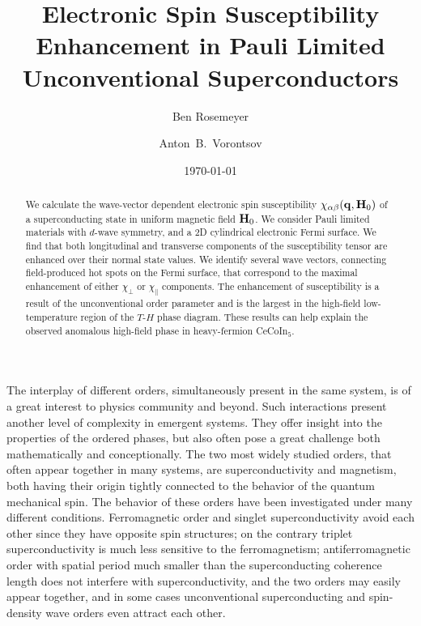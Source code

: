 \documentclass[aps,prl,twocolumn,showpacs,amsmath,amssymb]{revtex4-1}
\newcommand{\red}{\textcolor{red}}
\newcommand{\cecoin}{CeCoIn$_5$}
\begin{document}
\title{Electronic Spin Susceptibility Enhancement in Pauli Limited Unconventional Superconductors}

\author{Ben Rosemeyer}
\author{Anton~B.~Vorontsov}


\date{\today}

\begin{abstract}
%
We calculate the wave-vector dependent electronic spin susceptibility 
$\chi_{\alpha\beta}({\bf q}, {\bf H}_0)$ 
of a superconducting state in uniform magnetic field ${\bf H}_0$. 
We consider Pauli limited materials with $d$-wave symmetry, and a 2D cylindrical 
electronic Fermi surface.  
We find that both longitudinal and transverse components of the susceptibility tensor are enhanced over their
normal state values.  
We identify several wave vectors, connecting field-produced hot spots on the Fermi surface, 
that correspond to the maximal enhancement of either $\chi_\perp$ or $\chi_\parallel$ components. 
The enhancement of susceptibility is a result of the unconventional order parameter and is the 
largest 
in the high-field low-temperature region of the $T$-$H$
phase diagram. 
These results can help explain the observed anomalous high-field phase in heavy-fermion \cecoin. 
%
\end{abstract} 




\maketitle


%
The interplay of different orders, simultaneously present in the same system, 
is of a great interest to physics community and beyond. 
Such interactions present another level of complexity in emergent systems. 
They offer insight into the properties of the ordered phases, but also 
often pose a great challenge both mathematically 
and conceptionally.\cite{x}
The two most widely studied orders, that often appear together in many systems, 
are superconductivity and magnetism, both having their origin tightly 
connected to the behavior of the quantum mechanical spin. 
The behavior of these orders have been investigated under many different conditions. 
Ferromagnetic order and singlet superconductivity avoid each other since they have opposite spin 
structures\cite{x}; 
on the contrary triplet superconductivity is much less sensitive to the ferromagnetism\cite{x}; 
antiferromagnetic order with spatial period much smaller than the superconducting coherence length 
does not interfere with superconductivity, and the two orders may easily appear together\cite{x},  
and in some cases unconventional superconducting and spin-density wave orders even attract each other\cite{x}. 
\end{document}

